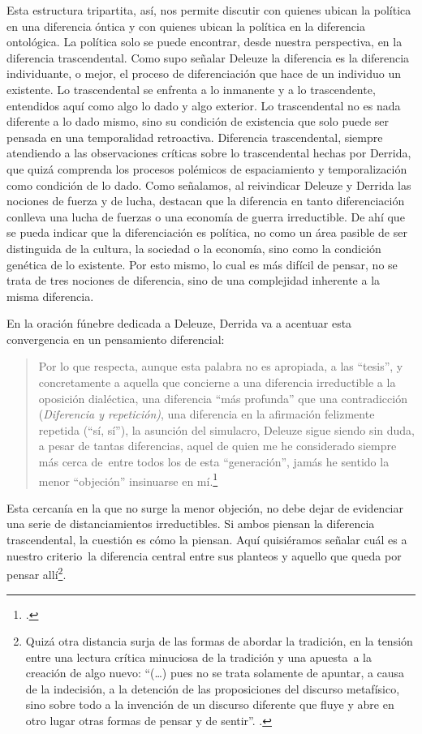 Esta estructura tripartita, así, nos permite discutir con quienes ubican la política en una diferencia óntica y con quienes ubican la política en la diferencia ontológica. La política solo se puede encontrar, desde nuestra perspectiva, en la diferencia trascendental. Como supo señalar Deleuze la diferencia es la diferencia individuante, o mejor, el proceso de diferenciación que hace de un individuo un existente. Lo trascendental se enfrenta a lo inmanente y a lo trascendente, entendidos aquí como algo lo dado y algo exterior. Lo trascendental no es nada diferente a lo dado mismo, sino su condición de existencia que solo puede ser pensada en una temporalidad retroactiva. Diferencia trascendental, siempre atendiendo a las observaciones críticas sobre lo trascendental hechas por Derrida, que quizá comprenda los procesos polémicos de espaciamiento y temporalización como condición de lo dado. Como señalamos, al reivindicar Deleuze y Derrida las nociones de fuerza y de lucha, destacan que la diferencia en tanto diferenciación conlleva una lucha de fuerzas o una economía de guerra irreductible. De ahí que se pueda indicar que la diferenciación es política, no como un área pasible de ser distinguida de la cultura, la sociedad o la economía, sino como la condición genética  de lo existente. Por esto mismo, lo cual es más difícil de pensar, no se trata de tres nociones de diferencia, sino de una complejidad inherente a la misma diferencia.

En la oración fúnebre dedicada a Deleuze, Derrida va a acentuar esta convergencia en un pensamiento diferencial:

\begin{quote}
Por lo que respecta, aunque esta palabra no es apropiada, a las \enquote{tesis}, y concretamente a aquella que concierne a una diferencia irreductible a la oposición dialéctica, una diferencia \enquote{más profunda} que una contradicción (\emph{Diferencia y repetición)}, una diferencia en la afirmación felizmente repetida (\enquote{sí, sí}), la asunción del simulacro, Deleuze sigue siendo sin duda, a pesar de tantas diferencias, aquel de quien me he considerado siempre más cerca de~entre todos los de esta \enquote{generación}, jamás he sentido la menor \enquote{objeción} insinuarse en mí.\footcite{@6992-DERRIDA2005}
\end{quote}

Esta cercanía en la que no surge la menor objeción, no debe dejar de evidenciar una serie de distanciamientos irreductibles. Si ambos piensan la diferencia trascendental, la cuestión es cómo la piensan. Aquí quisiéramos señalar cuál es a nuestro criterio~la diferencia central entre sus planteos y aquello que queda por pensar allí\footnote{Quizá otra distancia surja de las formas de abordar la tradición, en la tensión entre una lectura crítica minuciosa de la tradición y una apuesta~a la creación de algo nuevo: \enquote{(\ldots) pues no se trata solamente de apuntar, a causa de la indecisión, a la detención de las proposiciones del discurso metafísico, sino sobre todo a la invención de un discurso diferente que fluye y abre en otro lugar otras formas de pensar y de sentir}. \cite[114]{@6993-MENGUE2008}.}.

